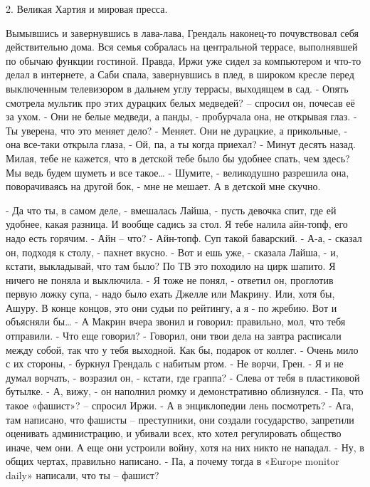 \documentclass{book}
\begin{document}
2. Великая Хартия и мировая пресса.


Вымывшись и завернувшись в лава-лава, Грендаль наконец-то почувствовал себя действительно дома. Вся семья собралась на центральной террасе, выполнявшей по обычаю функции гостиной. Правда, Иржи уже сидел за компьютером и что-то делал в интернете, а Саби спала, завернувшись в плед, в широком кресле перед выключенным телевизором в дальнем углу террасы, выходящем в сад.
- Опять смотрела мультик про этих дурацких белых медведей? -- спросил он, почесав её за ухом.
- Они не белые медведи, а панды, - пробурчала она, не открывая глаз.
- Ты уверена, что это меняет дело?
- Меняет. Они не дурацкие, а прикольные, - она все-таки открыла глаза, - Ой, па, а ты когда приехал?
- Минут десять назад. Милая, тебе не кажется, что в детской тебе было бы удобнее спать, чем здесь? Мы ведь будем шуметь и все такое\ldots{}
- Шумите, - великодушно разрешила она, поворачиваясь на другой бок, - мне не мешает. А в детской мне скучно.

- Да что ты, в самом деле, - вмешалась Лайша, - пусть девочка спит, где ей удобнее, какая разница. И вообще садись за стол. Я тебе налила айн-топф, его надо есть горячим.
- Айн -- что?
- Айн-топф. Суп такой баварский.
- А-а, - сказал он, подходя к столу, - пахнет вкусно.
- Вот и ешь уже, - сказала Лайша, - и, кстати, выкладывай, что там было? По ТВ это походило на цирк шапито. Я ничего не поняла и выключила.
- Я тоже не понял, - ответил он, проглотив первую ложку супа, - надо было ехать Джелле или Макрину. Или, хотя бы, Ашуру. В конце концов, это они судьи по рейтингу, а я - по жребию. Вот и объясняли бы\ldots{}
- А Макрин вчера звонил и говорил: правильно, мол, что тебя отправили.
- Что еще говорил?
- Говорил, они твои дела на завтра расписали между собой, так что у тебя выходной. Как бы, подарок от коллег.
- Очень мило с их стороны, - буркнул Грендаль с набитым ртом.
- Не ворчи, Грен.
- Я и не думал ворчать, - возразил он, - кстати, где граппа?
- Слева от тебя в пластиковой бутылке.
- А, вижу, - он наполнил рюмку и демонстративно облизнулся.
- Па, что такое «фашист»? -- спросил Иржи.
- А в энциклопедии лень посмотреть?
- Ага, там написано, что фашисты -- преступники, они создали государство, запретили оценивать администрацию, и убивали всех, кто хотел регулировать общество иначе, чем они. А еще они устроили войну, хотя на них никто не нападал.
- Ну, в общих чертах, правильно написано.
- Па, а почему тогда в «Europe monitor daily» написали, что ты -- фашист?
\end{document}
